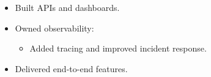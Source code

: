 \begin{itemize}
  \item Built APIs and dashboards.
  \item Owned observability:
    \begin{itemize}
      \item Added tracing and improved incident response.
    \end{itemize}
  \item Delivered end-to-end features.
\end{itemize}
